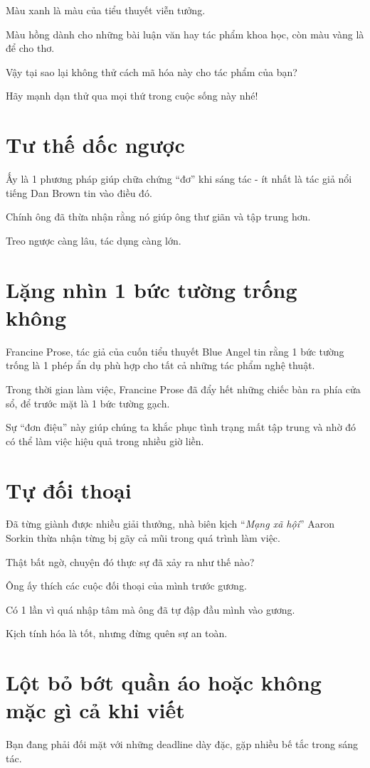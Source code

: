 \documentclass{book}
\numberwithin{equation}{section}
\begin{document}
Màu xanh là màu của tiểu thuyết viễn tưởng.

Màu hồng dành cho những bài luận văn hay tác phẩm khoa học, còn màu vàng là để cho thơ.

Vậy tại sao lại không thử cách mã hóa này cho tác phẩm của bạn?

Hãy mạnh dạn thử qua mọi thứ trong cuộc sống này nhé!

\section{Tư thế dốc ngược}
Ấy là 1 phương pháp giúp chữa chứng ``đơ'' khi sáng tác -  ít nhất là tác giả nổi tiếng Dan Brown tin vào điều đó.

Chính ông đã thừa nhận rằng nó giúp ông thư giãn và tập trung hơn.

Treo ngược càng lâu, tác dụng càng lớn.
 
\section{Lặng nhìn 1 bức tường trống không}
Francine Prose, tác giả của cuốn tiểu thuyết Blue Angel tin rằng 1 bức tường trống là 1 phép ẩn dụ phù hợp cho tất cả những tác phẩm nghệ thuật.

Trong thời gian làm việc, Francine Prose đã đẩy hết những chiếc bàn ra phía cửa sổ, để trước mặt là 1 bức tường gạch.

Sự ``đơn điệu''  này giúp chúng ta khắc phục tình trạng mất tập trung và nhờ đó có thể làm việc hiệu quả trong nhiều giờ liền.

\section{Tự đối thoại}
Đã từng giành được nhiều giải thưởng, nhà biên kịch ``\textit{Mạng xã hội}'' Aaron Sorkin thừa nhận từng bị gãy cả mũi trong quá trình làm việc.

Thật bất ngờ, chuyện đó thực sự đã xảy ra như thế nào?

Ông ấy thích các cuộc đối thoại của mình trước gương.

Có 1 lần vì quá nhập tâm mà ông đã tự đập đầu mình vào gương.

Kịch tính hóa là tốt, nhưng đừng quên sự an toàn.

\section{Lột bỏ bớt quần áo hoặc không mặc gì cả khi viết}
Bạn đang phải đối mặt với những deadline dày đặc, gặp nhiều bế tắc trong sáng tác.
\end{document}
